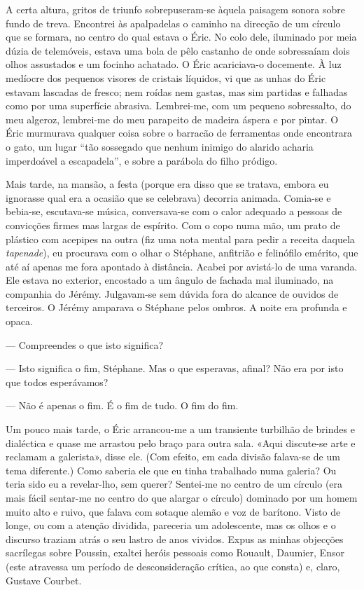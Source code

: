 A certa altura, gritos de triunfo sobrepuseram-se àquela
paisagem sonora sobre fundo de treva. Encontrei às apalpadelas o
caminho na direcção de um círculo que se formara, no centro do qual
estava o Éric. No colo dele, iluminado por meia dúzia de telemóveis,
estava uma bola de pêlo castanho de onde sobressaíam dois olhos
assustados e um focinho achatado. O Éric acariciava-o docemente. À luz
medíocre dos pequenos visores de cristais líquidos, vi que as unhas do
Éric estavam lascadas de fresco; nem roídas nem gastas, mas sim partidas
e falhadas como por uma superfície abrasiva. Lembrei-me, com um pequeno
sobressalto, do meu algeroz, lembrei-me do meu parapeito de madeira
áspera e por pintar. O Éric murmurava qualquer coisa sobre o barracão de
ferramentas onde encontrara o gato, um lugar ``tão sossegado que
nenhum inimigo do alarido acharia imperdoável a escapadela'', e sobre a
parábola do filho pródigo.

Mais tarde, na mansão, a festa (porque era disso que se tratava,
embora eu ignorasse qual era a ocasião que se celebrava) decorria
animada. Comia-se e bebia-se, escutava-se música, conversava-se com o
calor adequado a pessoas de convicções firmes mas largas de espírito.
Com o copo numa mão, um prato de plástico com acepipes na outra (fiz
uma nota mental para pedir a receita daquela \emph{tapenade}), eu
procurava com o olhar o Stéphane, anfitrião e felinófilo emérito, que
até aí apenas me fora apontado à distância. Acabei por avistá-lo de uma
varanda. Ele estava no exterior, encostado a um ângulo de fachada mal
iluminado, na companhia do Jérémy. Julgavam-se sem dúvida fora do
alcance de ouvidos de terceiros. O Jérémy amparava o Stéphane pelos
ombros. A noite era profunda e opaca.

--- Compreendes o que isto significa?

--- Isto significa o fim, Stéphane. Mas o que esperavas, afinal? Não era
  por isto que todos esperávamos?

--- Não é apenas o fim. É o fim de tudo. O fim do fim.

Um pouco mais
tarde, o Éric arrancou-me a um transiente turbilhão de brindes e
dialéctica e quase me arrastou pelo braço
para outra sala. «Aqui discute-se arte e reclamam a galerista», disse
ele. (Com efeito, em cada divisão falava-se de um tema diferente.) Como
saberia ele que eu tinha trabalhado numa galeria? Ou teria sido eu a
revelar-lho, sem querer? Sentei-me no centro de um círculo (era mais
fácil sentar-me no centro do que alargar o círculo) dominado por um
homem muito alto e ruivo, que falava com sotaque alemão e voz de
barítono. Visto de longe, ou com a atenção dividida, pareceria um
adolescente, mas os olhos e o discurso traziam atrás o seu lastro de
anos vividos. Expus as minhas objecções sacrílegas sobre Poussin,
exaltei heróis pessoais como Rouault, Daumier, Ensor (este atravessa um
período de desconsideração crítica, ao que consta) e, claro, Gustave
Courbet.


